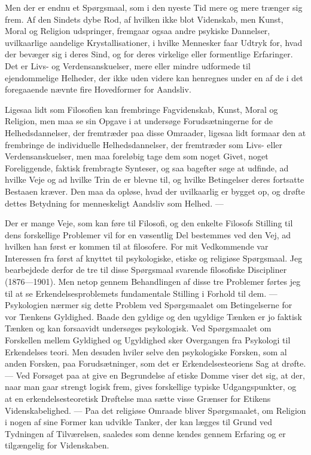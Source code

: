 \documentclass[12pt]{article}
\newcommand{\opage}[1]{\marginnote{\footnotesize\textit{[#1]}}}
\begin{document}
Men der er endnu et Spørgsmaal, som i den nyeste Tid mere og mere
trænger sig frem. Af den Sindets dybe Rod, af hvilken ikke blot
Videnskab, men Kunst, Moral og Religion udspringer, fremgaar ogsaa
andre psykiske Dannelser, uvilkaarlige aandelige Krystallisationer, i
hvilke Mennesker faar Udtryk for, hvad der bevæger sig i deres Sind,
og for
\opage{5}deres virkelige eller formentlige Erfaringer. Det er Livs- og
Verdensanskuelser, mere eller mindre udformede til ejendommelige
Helheder, der ikke uden videre kan henregnes under en af de i det
foregaaende nævnte fire Hovedformer for Aandsliv.

Ligesaa lidt som Filosofien kan frembringe Fagvidenskab, Kunst, Moral
og Religion, men maa se sin Opgave i at undersøge Forudsætningerne
for de Helhedsdannelser, der fremtræder paa disse Omraader, ligesaa
lidt formaar den at frembringe de individuelle Helhedsdannelser, der
fremtræder som Livs- eller Verdensanskuelser, men maa foreløbig tage
dem som noget Givet, noget Foreliggende, faktisk frembragte Synteser,
og saa bagefter søge at udfinde, ad hvilke Veje og ad hvilke Trin de
er blevne til, og hvilke Betingelser deres fortsatte Bestaaen kræver.
Den maa da opløse, hvad der uvilkaarlig er bygget op, og drøfte
dettes Betydning for menneskeligt Aandsliv som Helhed. ---

Der er mange Veje, som kan føre til Filosofi, og den enkelte Filosofs
Stilling til dens forskellige Problemer vil for en væsentlig Del
bestemmes ved den Vej, ad hvilken han først er kommen til at
filosofere. For mit Vedkommende var Interessen fra først af knyttet
til psykologiske, etiske og religiøse Spørgsmaal. Jeg bearbejdede
derfor de tre til disse Spørgsmaal svarende filosofiske Discipliner
(1876---1901). Men netop gennem Behandlingen af disse tre Problemer
førtes jeg til at se Erkendelsesproblemets fundamentale Stilling i
Forhold til dem. --- Psykologien nærmer sig dette Problem ved
Spørgsmaalet om Betingelserne for vor Tænkens Gyldighed. Baade den
gyldige og den ugyldige Tænken er jo faktisk Tænken og kan forsaavidt
undersøges psykologisk. Ved Spørgsmaalet om Forskellen mellem
Gyldighed og Ugyldighed sker Overgangen fra Psykologi til Erkendelses%
\setcounter{footnote}{0}%
\opage{6}teori. Men desuden hviler selve den psykologiske Forsken, som
al anden Forsken, paa Forudsætninger, som det er Erkendelsesteoriens
Sag at drøfte. --- Ved Forsøget paa at give en Begrundelse af etiske
Domme viser det sig, at der, naar man gaar strengt logisk frem, gives
forskellige typiske Udgangspunkter, og at en erkendelsesteoretisk
Drøftelse maa sætte visse Grænser for Etikens Videnskabelighed. ---
Paa det religiøse Omraade bliver Spørgsmaalet, om Religion i nogen af
sine Former kan udvikle Tanker, der kan lægges til Grund ved
Tydningen af Tilværelsen, saaledes som denne kendes gennem Erfaring og
er tilgængelig for Videnskaben.
\end{document}
